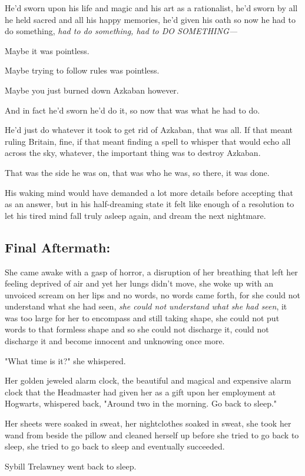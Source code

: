 He'd sworn upon his life and magic and his art as a rationalist, he'd sworn by 
all he held sacred and all his happy memories, he'd given his oath so now he 
had to do something, \emph{had to do something, had to DO SOMETHING---}

Maybe it was pointless.

Maybe trying to follow rules was pointless.

Maybe you just burned down Azkaban however.

And in fact he'd sworn he'd do it, so now that was what he had to do.

He'd just do whatever it took to get rid of Azkaban, that was all. If that 
meant ruling Britain, fine, if that meant finding a spell to whisper that would 
echo all across the sky, whatever, the important thing was to destroy Azkaban.

That was the side he was on, that was who he was, so there, it was done.

His waking mind would have demanded a lot more details before accepting that as 
an answer, but in his half-dreaming state it felt like enough of a resolution 
to let his tired mind fall truly asleep again, and dream the next nightmare.
\sbreak
\subsection{Final Aftermath:}

She came awake with a gasp of horror, a disruption of her breathing that left 
her feeling deprived of air and yet her lungs didn't move, she woke up with an 
unvoiced scream on her lips and no words, no words came forth, for she could 
not understand what she had seen, \emph{she could not understand what she had 
seen}, it was too large for her to encompass and still taking shape, she could 
not put words to that formless shape and so she could not discharge it, could 
not discharge it and become innocent and unknowing once more.

"What time is it?" she whispered.

Her golden jeweled alarm clock, the beautiful and magical and expensive alarm 
clock that the Headmaster had given her as a gift upon her employment at 
Hogwarts, whispered back, "Around two in the morning. Go back to sleep."

Her sheets were soaked in sweat, her nightclothes soaked in sweat, she took her 
wand from beside the pillow and cleaned herself up before she tried to go back 
to sleep, she tried to go back to sleep and eventually succeeded.

Sybill Trelawney went back to sleep.
